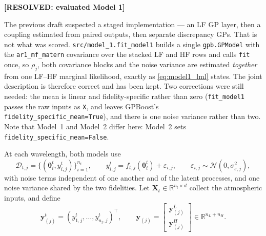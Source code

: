 \documentclass[12pt, letterpaper, oneside]{article}
\newcommand{\resolved}[2]{\par\begingroup\small\color{green!35!black}%
\noindent\textbf{[RESOLVED: #1]}\par\nobreak\noindent #2\par\endgroup}
\begin{document}
\resolved{evaluated Model 1}{The previous draft suspected a staged
implementation --- an LF GP layer, then a coupling estimated from paired
outputs, then separate discrepancy GPs. That is not what was scored.
\texttt{src/model\_1.fit\_model1} builds a single \texttt{gpb.GPModel} with the
\texttt{ar1\_mf\_matern} covariance over the stacked LF and HF rows and calls
\texttt{fit} once, so $\rho_j$, both covariance blocks and the noise variance
are estimated \emph{together} from one LF--HF marginal likelihood, exactly as
\eqref{eq:model1_lml} states. The joint description is therefore correct and
has been kept. Two corrections were still needed: the mean is linear and
fidelity-specific rather than zero (\texttt{fit\_model1} passes the raw inputs
as \texttt{X}, and leaves GPBoost's \texttt{fidelity\_specific\_mean=True}),
and there is one noise variance rather than two. Note that Model~1 and Model~2
differ here: Model~2 sets \texttt{fidelity\_specific\_mean=False}.}

At each wavelength, both models use
\begin{equation}
    \mathcal{D}_{t,j}
    = \{(\bm\theta_i^t,y_{i,j}^t)\}_{i=1}^{n_t},
    \qquad
    y_{i,j}^t=f_{t,j}(\bm\theta_i^t)+\varepsilon_{i,j},
    \qquad
    \varepsilon_{i,j}\sim
    \mathcal{N}(0,\sigma^2_{\varepsilon,j}),
    \label{eq:perbin-data}
\end{equation}
with noise terms independent of one another and of the latent processes, and
one noise variance shared by the two fidelities. Let
$\mathbf{X}_t\in\mathbb{R}^{n_t\times d}$ collect the atmospheric inputs, and
define
\begin{equation}
    \mathbf{y}_{(j)}^t
    = (y_{1,j}^t,\ldots,y_{n_t,j}^t)^\top,
    \qquad
    \mathbf{y}_{(j)}
    = \begin{bmatrix}
        \mathbf{y}_{(j)}^L \\
        \mathbf{y}_{(j)}^H
      \end{bmatrix}
    \in\mathbb{R}^{n_L+n_H}.
    \label{eq:model1-stacked}
\end{equation}
\end{document}
